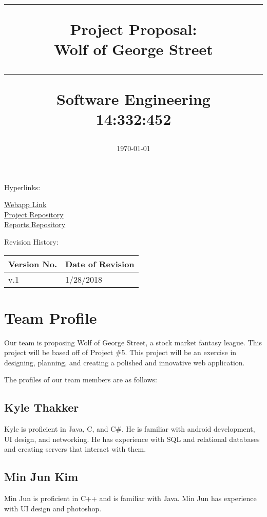 \documentclass[11pt,letterpaper,oneside]{memoir}
\title{%
{\color{color2} \hrule}\vspace{1cm}
\Huge{\color{color1} Project Proposal:\\Wolf of George Street
\vspace{1cm}
{\color{color2} \hrule}\vspace{1cm}}
\Large{ \color{color2} Software Engineering\\
14:332:452}
}
\author{\huge{\color{color0}Team 9:\\}\vskip.1in
\Large{\href{mailto:klt117@scarletmail.rutgers.edu}{Kyle Thakker}\\
\href{mailto:minjun2282@gmail.com}{Min Jun Kim}\\
\href{mailto:andy.i.val@rutgers.edu}{Andy Val}\\
\href{mailto:xodnjs55@gmail.com}{Taewon Kim}\\
\href{mailto:dly24@scarletmail.rutgers.edu}{Dan Yates}\\
\href{mailto:cjm351@scarletmail.rutgers.edu}{Colter Mooney}\\
\href{mailto:anb130@scarletmail.rutgers.edu}{Amina Bright}\\
\href{mailto:kishanpatel0897@gmail.com}{Kishan Patel}\\
\href{mailto:quentin1120@live.com}{Quentin Lester}}}
\date{\today}
\begin{document}
\titleGM    %

Hyperlinks:\\
\begin{center}
\href{https://sites.google.com/scarletmail.rutgers.edu/wolf-of-george-street/home}{Webapp Link}\\
\href{https://github.com/amina-bright/Wolf-of-George-Street-}{Project Repository}\\
\href{https://github.com/amina-bright/Wolf-of-George-Street-}{Reports Repository}\\
\end{center}

Revision History:
\begin{longtable}{|p{1.6in}|p{2.6in}|}
\hline
{\large\color{color1}Version No.}&{\large \color{color1}Date of Revision}\\
    \hline
v.1&1/28/2018  \\ \hline
\end{longtable}

\pagebreak  %
\tableofcontents %
\setlength\parindent{0pt}
\chapter{Team Profile}
Our team is proposing Wolf of George Street, a stock market fantasy league. This project will be based off of Project \#5. This project will be an exercise in designing, planning, and creating a polished and innovative web application.



The profiles of our team members are as follows:\\

\section{Kyle Thakker}
Kyle is proficient in Java, C, and C\#. He is familiar with android development, UI design, and networking. He has experience with SQL and relational databases and creating servers that interact with them.

\section{Min Jun Kim}
Min Jun is proficient in C++ and is familiar with Java. Min Jun has experience with UI design and photoshop. 
\end{document}
